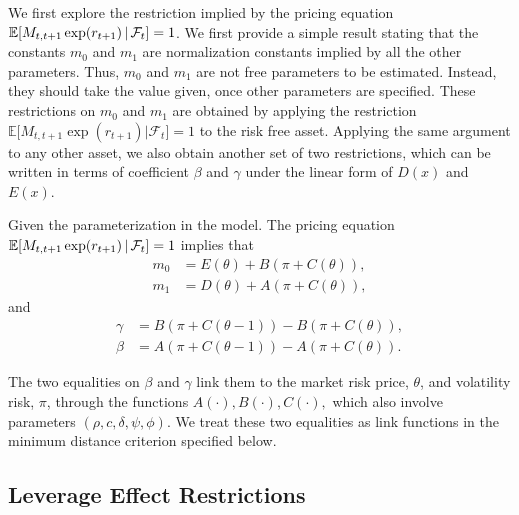\documentclass[11pt, letterpaper, twoside]{article}
\begin{document}
We first explore the restriction implied by the pricing equation $\operatorname{\mathbb{E}}[ M_{t,t+1}\exp (r_{t+1}) \,\vert\, \mathcal{F}_{t}]=1$. We first provide a simple result stating that the constants $m_{0}$ and $m_{1}$ are normalization constants implied by all the other parameters. Thus, $m_{0}$ and $m_{1}$ are not free parameters to be estimated. Instead, they should take the value given, once other parameters are specified. These restrictions on $m_{0}$ and $m_{1}$ are obtained by applying the restriction $\mathbb{E[} M_{t,t+1}\exp (r_{t+1})|\mathcal{F}_{t}]=1$ to the risk free asset. Applying the same argument to any other asset, we also obtain another set of two restrictions, which can be written in terms of coefficient $\beta $ and $ \gamma $ under the linear form of $D(x)$ and $E(x)$.

\begin{lemma}
    \label{Lemma m0 and m1}
    Given the parameterization in the model. The pricing equation $\operatorname{\mathbb{E}}[M_{t,t+1}\exp (r_{t+1}) \,\vert\, \mathcal{F}_{t}]=1$ implies that 
%
    \begin{align*}
        m_{0} &= E(\theta )+B\left( \pi +C\left( \theta \right) \right) , \\
%
        m_{1} &= D\left( \theta \right) +A\left( \pi +C\left( \theta \right) \right) ,
    \end{align*}
    and
%
    \begin{align*}
        \gamma  &= B\left( \pi +C\left( \theta -1\right) \right) -B\left( \pi +C\left( \theta \right) \right), \\
        \beta  &= A\left( \pi +C\left( \theta -1\right) \right) -A\left( \pi +C\left( \theta \right) \right).
    \end{align*}
\end{lemma}

The two equalities on $\beta $ and $\gamma $ link them to the market risk price, $\theta$, and volatility risk, $\pi$,  through the functions $A(\cdot),B(\cdot ),C(\cdot ),$ which also involve parameters $(\rho ,c,\delta ,\psi ,\phi ).$ We treat these two equalities as link functions in the minimum distance criterion specified below.

\subsection{Leverage Effect Restrictions}\label{sec:leverage effect restrict}
\end{document}

